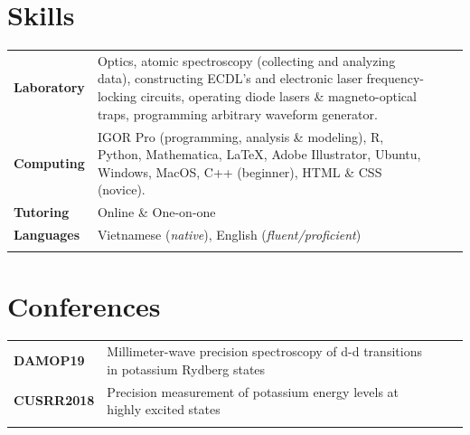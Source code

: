 \documentclass[a4paper, 10.5pt]{article}
\begin{document}
	\section*{\normalsize{{\color{colby}Skills}}}
		\begin{tabular}{lp{13.5cm}lp{8in}}
			
			\textbf{Laboratory} & Optics, atomic spectroscopy (collecting and analyzing data), constructing ECDL's and electronic laser frequency-locking circuits, operating diode lasers \& magneto-optical traps, programming arbitrary waveform generator.\\
			
			\textbf{Computing} & IGOR Pro (programming, analysis \& modeling), R, Python, Mathematica, \LaTeX{}, Adobe Illustrator, Ubuntu, Windows, MacOS, C++ (beginner), HTML \& CSS (novice).\\
			
			\textbf{Tutoring} & Online \& One-on-one\\
			
			\textbf{Languages} & Vietnamese (\textit{native}), English (\textit{fluent/proficient})\\\\
			
		\end{tabular}
	
	\section*{\normalsize{{\color{colby}Conferences}}}
		\begin{tabular}{lp{13.5cm}lp{8in}}
			\textbf{DAMOP19} & Millimeter-wave precision spectroscopy of d-d transitions in potassium Rydberg states \\
			\textbf{CUSRR2018} & Precision measurement of potassium energy levels at highly excited states\\\\
		\end{tabular}
	
\end{document}
